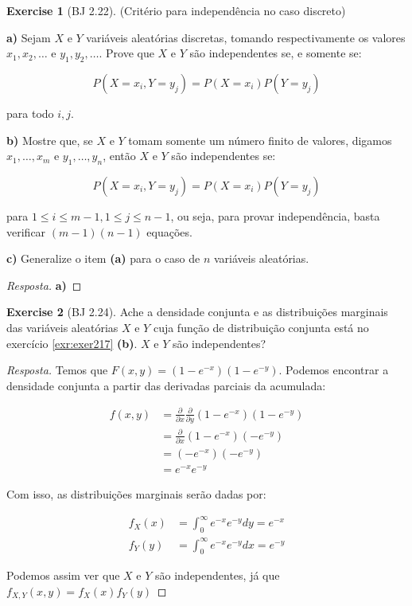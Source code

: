\documentclass[
]{article}
\theoremstyle{definition}
\theoremstyle{definition}
\theoremstyle{definition}
\newtheorem{exercise}{Exercise}[section]
\theoremstyle{definition}
\theoremstyle{remark}
\begin{document}
\begin{exercise}[BJ 2.22]
(Critério para independência no caso discreto)

\textbf{a)} Sejam \(X\) e \(Y\) variáveis aleatórias discretas, tomando respectivamente os valores \(x_{1},x_{2},\ldots\) e \(y_{1},y_{2},\ldots\). Prove que \(X\) e \(Y\) são independentes se, e somente se:

\begin{equation*}
P(X = x_{i},Y = y_{j}) = P(X = x_{i})P(Y = y_{j})
\end{equation*}

para todo \(i,j\).

\textbf{b)} Mostre que, se \(X\) e \(Y\) tomam somente um número finito de valores, digamos \(x_{1},\ldots,x_{m}\) e \(y_{1},\ldots,y_{n}\), então \(X\) e \(Y\) são independentes se:

\begin{equation*}
P(X = x_{i},Y = y_{j}) = P(X = x_{i})P(Y = y_{j})
\end{equation*}

para \(1 \le i \le m-1, 1 \le j \le n-1\), ou seja, para provar independência, basta verificar \((m-1)(n-1)\) equações.

\textbf{c)} Generalize o item \textbf{(a)} para o caso de \(n\) variáveis aleatórias.
\end{exercise}

\begin{proof}[Resposta]
\textbf{a)}
\end{proof}

\begin{exercise}[BJ 2.24]
Ache a densidade conjunta e as distribuições marginais das variáveis aleatórias \(X\) e \(Y\) cuja função de distribuição conjunta está no exercício \ref{exr:exer217} \textbf{(b)}. \(X\) e \(Y\) são independentes?
\end{exercise}

\begin{proof}[Resposta]
Temos que \(F(x,y) = (1 - e^{-x})(1 - e^{-y})\). Podemos encontrar a densidade conjunta a partir das derivadas parciais da acumulada:

\begin{align*}
f(x,y) &= \frac{\partial}{\partial x}\frac{\partial}{\partial y}(1-e^{-x})(1-e^{-y}) \\
&= \frac{\partial}{\partial x}(1-e^{-x})(-e^{-y}) \\
&= (-e^{-x})(-e^{-y}) \\
&= e^{-x}e^{-y}
\end{align*}

Com isso, as distribuições marginais serão dadas por:

\begin{align*}
f_{X}(x) &= \int_{0}^{\infty}e^{-x}e^{-y}dy = e^{-x} \\
f_{Y}(y) &= \int_{0}^{\infty}e^{-x}e^{-y}dx = e^{-y}
\end{align*}

Podemos assim ver que \(X\) e \(Y\) são independentes, já que \(f_{X,Y}(x,y) = f_{X}(x)f_{Y}(y)\)
\end{proof}
\end{document}
